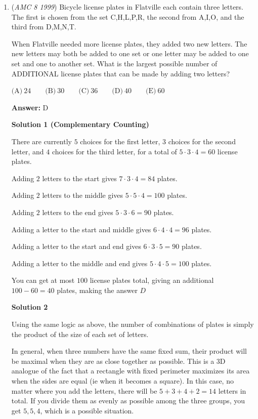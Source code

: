 \begin{enumerate}
 


	\item (\textit{AMC 8 1999}) Bicycle license plates in Flatville each contain three letters. The first is chosen from the set {C,H,L,P,R}, the second from {A,I,O}, and the third from {D,M,N,T}. 


 When Flatville needed more license plates, they added two new letters. The new letters may both be added to one set or one letter may be added to one set and one to another set. What is the largest possible number of ADDITIONAL license plates that can be made by adding two letters?


 $\text{(A)}\ 24 \qquad \text{(B)}\ 30 \qquad \text{(C)}\ 36 \qquad \text{(D)}\ 40 \qquad \text{(E)}\ 60$

 \textbf{Answer: }D



\textbf{Solution 1 (Complementary Counting)}

There are currently $5$ choices for the first letter, $3$ choices for the second letter, and $4$ choices for the third letter, for a total of $5 \cdot 3 \cdot 4 = 60$ license plates.

 Adding $2$ letters to the start gives $7\cdot 3 \cdot 4 = 84$ plates.

 Adding $2$ letters to the middle gives $5 \cdot 5 \cdot 4 = 100$ plates.

 Adding $2$ letters to the end gives $5 \cdot 3 \cdot 6 = 90$ plates.

 Adding a letter to the start and middle gives $6 \cdot 4 \cdot 4 = 96$ plates.

 Adding a letter to the start and end gives $6 \cdot 3 \cdot 5 = 90$ plates.

 Adding a letter to the middle and end gives $5 \cdot 4 \cdot 5 = 100$ plates.

 You can get at most $100$ license plates total, giving an additional $100 - 60 = 40$ plates, making the answer $\boxed {D}$




\textbf{Solution 2}

Using the same logic as above, the number of combinations of plates is simply the product of the size of each set of letters.

 In general, when three numbers have the same fixed sum, their product will be maximal when they are as close together as possible.  This is a 3D analogue of the fact that a rectangle with fixed perimeter maximizes its area when the sides are equal (ie when it becomes a square).  In this case, no matter where you add the letters, there will be $5 + 3 + 4 + 2 = 14$ letters in total.  If you divide them as evenly as possible among the three groups, you get $5, 5, 4$, which is a possible situation.


\end{enumerate}

